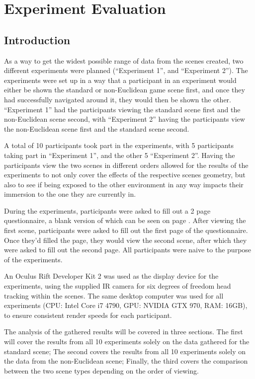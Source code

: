 \chapter[Experiment]{Experiment Evaluation}
\label{exp}

	\section{Introduction}
	\label{exp:intro}

		As a way to get the widest possible range of data from the scenes created, two different experiments were planned (\enquote{Experiment 1}, and \enquote{Experiment 2}).
		The experiments were set up in a way that a participant in an experiment would either be shown the standard or non-Euclidean game scene first, and once they had successfully navigated around it, they would then be shown the other.
		\enquote{Experiment 1} had the participants viewing the standard scene first and the non-Euclidean scene second, with \enquote{Experiment 2} having the participants view the non-Euclidean scene first and the standard scene second.

		A total of 10 participants took part in the experiments, with 5 participants taking part in \enquote{Experiment 1}, and the other 5 \enquote{Experiment 2}.
		Having the participants view the two scenes in different orders allowed for the results of the experiments to not only cover the effects of the respective scenes geometry, but also to see if being exposed to the other environment in any way impacts their immersion to the one they are currently in. %

		During the experiments, participants were asked to fill out a 2 page questionnaire, a blank version of which can be seen on page \pageref{appendix:question}.
		After viewing the first scene, participants were asked to fill out the first page of the questionnaire. Once they'd filled the page, they would view the second scene, after which they were asked to fill out the second page. %
		All participants were naive to the purpose of the experiments.

		An Oculus Rift Developer Kit 2 was used as the display device for the experiments, using the supplied IR camera for six degrees of freedom head tracking within the scenes.
		The same desktop computer was used for all experiments (CPU: Intel Core i7 4790, GPU: NVIDIA GTX 970, RAM: 16GB), to ensure consistent render speeds for each participant.

		The analysis of the gathered results will be covered in three sections. The first will cover the results from all 10 experiments solely on the data gathered for the standard scene; The second covers the results from all 10 experiments solely on the data from the non-Euclidean scene; Finally, the third covers the comparison between the two scene types depending on the order of viewing. %

